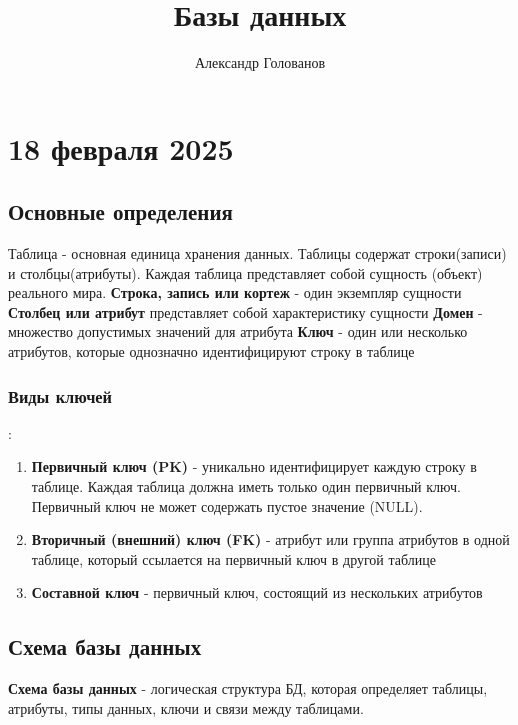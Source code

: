 \documentclass[]{article}
\title{Базы данных}
\author{Александр Голованов}
\begin{document}
\maketitle
\newpage
\tableofcontents
\newpage

\section{18 февраля 2025}
\subsection{Основные определения}
Таблица - основная единица хранения данных. Таблицы содержат строки(записи) и столбцы(атрибуты). Каждая таблица представляет собой сущность (объект) реального мира.
\newline
\textbf{Строка, запись или кортеж} - один экземпляр сущности
\newline
\textbf{Столбец или атрибут} представляет собой характеристику сущности
\newline
\textbf{Домен} - множество допустимых значений для атрибута
\newline
\textbf{Ключ} - один или несколько атрибутов, которые однозначно идентифицируют строку в таблице
\newline 
 \subsubsection{Виды ключей}: 
\begin{enumerate}
\item \textbf{Первичный ключ (PK)} - уникально идентифицирует каждую строку в таблице. Каждая таблица должна иметь только один первичный ключ. Первичный ключ не может содержать пустое значение (NULL).
\item \textbf{Вторичный (внешний) ключ (FK)} - атрибут или группа атрибутов в одной таблице, который ссылается на первичный ключ в другой таблице
\item \textbf{Составной ключ} - первичный ключ, состоящий из нескольких атрибутов
\end{enumerate}
\subsection{Схема базы данных}
\textbf{Схема базы данных} - логическая структура БД, которая определяет таблицы, атрибуты, типы данных, ключи и связи между таблицами. 
\end{document}
